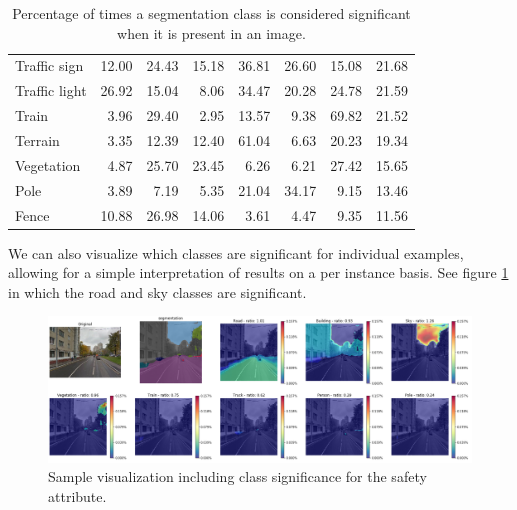 \begin{table}[H]
\begin{tabular}{|l|rrrrrrr|}
		Traffic sign   & 12.00            & 24.43               & 15.18           & 36.81           & 26.60           & 15.08              & 21.68            \\
		Traffic light  & 26.92            & 15.04               & 8.06            & 34.47           & 20.28           & 24.78              & 21.59            \\
		Train          & 3.96             & 29.40               & 2.95            & 13.57           & 9.38            & 69.82              & 21.52            \\
		Terrain        & 3.35             & 12.39               & 12.40           & 61.04           & 6.63            & 20.23              & 19.34            \\
		Vegetation     & 4.87             & 25.70               & 23.45           & 6.26            & 6.21            & 27.42              & 15.65            \\
		Pole           & 3.89             & 7.19                & 5.35            & 21.04           & 34.17           & 9.15               & 13.46            \\
		Fence          & 10.88            & 26.98               & 14.06           & 3.61            & 4.47            & 9.35               & 11.56            \\
		\hline
	\end{tabular}
	\caption[Percentage of class significance]{
		Percentage of times a segmentation class is considered significant when it is present in an image.
	}
	\label{tab:presence_sig}
\end{table}

We can also visualize which classes are significant for individual examples, allowing
for a simple interpretation of results on a per instance basis.
See figure \ref{fig:ratio} in which the road and sky classes are significant.

\begin{figure}[ht]
	\begin{center}
	\includegraphics[width=1\textwidth]{./figures/ratio.png}
	\caption[Example of significance ratio]{
        Sample visualization including class significance for the safety attribute.
        }
	\label{fig:ratio}
	\end{center}
\end{figure}


